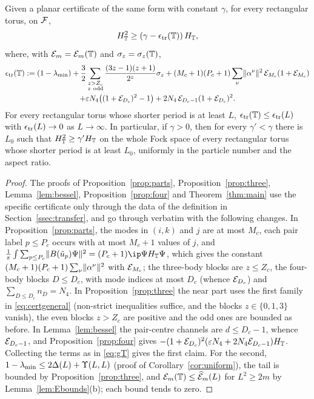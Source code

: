 \begin{theorem}\label{thm:transfer}
Given a planar certificate of the same form with constant $\gamma$, for every rectangular torus, on $\mathcal{F}$,
\[
H_{\mathbb{T}}^2\ge(\gamma-\epsilon_{\mathrm{tr}}(\mathbb{T}))\,H_{\mathbb{T}},
\]
where, with $\mathcal{E}_m=\mathcal{E}_m(\mathbb{T})$ and $\sigma_z=\sigma_z(\mathbb{T})$,
\begin{multline*}
\etr(\Tor):=(1-\lambda_{\min})+\frac32\sum_{\substack{z>Z_c\\ z\ \mathrm{odd}}}\frac{(3z-1)(z+1)}{2^z}\sigma_z
+(M_c+1)(P_c+1)\sum_\nu\norm{\alpha^\nu}^2\,\Ec_{M_c}(1+\Ec_{M_c})\\
+\eps N_4\bigl((1+\Ec_{D_c})^2-1\bigr)+2N_4\,\Ec_{D_c-1}(1+\Ec_{D_c})^2 .
\end{multline*}
For every rectangular torus whose shorter period is at least $L$, $\epsilon_{\mathrm{tr}}(\mathbb{T})\le\epsilon_{\mathrm{tr}}(L)$ with $\epsilon_{\mathrm{tr}}(L)\to0$ as $L\to\infty$.
In particular, if $\gamma>0$, then for every $\gamma'<\gamma$ there is $L_0$ such that $H_{\mathbb{T}}^2\ge\gamma'H_{\mathbb{T}}$ on the whole Fock space of every
rectangular torus whose shorter period is at least $L_0$, uniformly in the particle number and the aspect ratio.
\end{theorem}

\begin{proof}
The proofs of Proposition~\ref{prop:parts}, Proposition~\ref{prop:three}, Lemma~\ref{lem:bessel}, Proposition~\ref{prop:four} and
Theorem~\ref{thm:main} use the specific certificate only through the data of the definition in Section~\ref{ssec:transfer}, and go
through verbatim with the following changes. In Proposition~\ref{prop:parts}, the modes in $(i,k)$ and $j$ are at most $M_c$, each pair label $p\le P_c$
occurs with at most $M_c+1$ values of $j$, and $\frac1\pi\int\sum_{p\le P_c}\norm{B(\ut_p)\Psi}^2=(P_c+1)\ip\Psi{\HT\Psi}$, which gives the
constant $(M_c+1)(P_c+1)\sum_\nu\lVert\alpha^\nu\rVert^2$ with $\mathcal{E}_{M_c}$; the three-body blocks are $z\le Z_c$, the four-body blocks
$D\le D_c$, with mode indices at most $D_c$ (whence $\mathcal{E}_{D_c}$) and $\sum_{D\le D_c}n_D=N_4$. In Proposition~\ref{prop:three} the near
part uses the first family in \eqref{eq:certgeneral} (non-strict inequalities suffice, and the blocks $z\in\{0,1,3\}$ vanish), the
even blocks $z>Z_c$ are positive and the odd ones are bounded as before. In Lemma~\ref{lem:bessel} the pair-centre channels are
$d\le D_c-1$, whence $\mathcal{E}_{D_c-1}$, and Proposition~\ref{prop:four} gives $-(1+\mathcal{E}_{D_c})^2(\varepsilon N_4+2N_4\mathcal{E}_{D_c-1})H_{\mathbb{T}}$. Collecting the
terms as in \eqref{eq:gT} gives the first claim. For the second, $1-\lambda_{\min}\le2\Delta(L)+\Upsilon(L,L)$ (proof of
Corollary~\ref{cor:uniform}), the tail is bounded by Proposition~\ref{prop:three}, and $\mathcal{E}_m(\mathbb{T})\le\widehat{\mathcal{E}}_m(L)$ for
$L^2\ge2m$ by Lemma~\ref{lem:Ebounds}(b); each bound tends to zero.
\end{proof}
